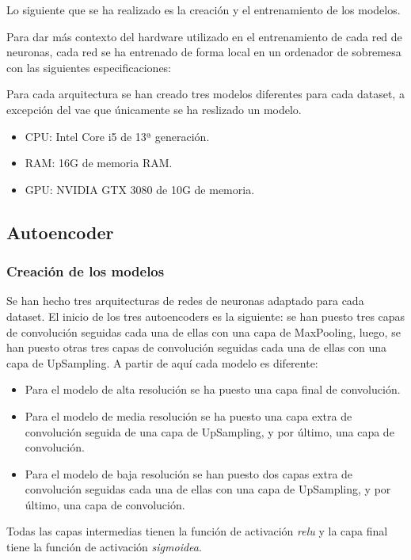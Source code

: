 Lo siguiente que se ha realizado es la creación y el entrenamiento de los modelos. 

Para dar más contexto del hardware utilizado en el entrenamiento de cada red de neuronas, cada red se ha entrenado de forma local en un ordenador de sobremesa con las siguientes especificaciones:

Para cada arquitectura se han creado tres modelos diferentes para cada dataset, a excepción del \gls{vae} que únicamente se ha reslizado un modelo.

\begin{itemize}
	\item CPU: Intel Core i5 de 13ª generación.
	\item RAM: 16G de memoria RAM.
	\item GPU: NVIDIA GTX 3080 de 10G de memoria.
\end{itemize}

\subsection{Autoencoder}

\subsubsection{Creación de los modelos}

\quad Se han hecho tres arquitecturas de redes de neuronas adaptado para cada dataset. El inicio de los tres autoencoders es la siguiente: se han puesto tres capas de convolución seguidas cada una de ellas con una capa de MaxPooling, luego, se han puesto otras tres capas de convolución seguidas cada una de ellas con una capa de UpSampling. A partir de aquí cada modelo es diferente:

\begin{itemize}
	\item Para el modelo de alta resolución se ha puesto una capa final de convolución.
	\item Para el modelo de media resolución se ha puesto una capa extra de convolución seguida de una capa de UpSampling, y por último, una capa de convolución.
	\item Para el modelo de baja resolución se han puesto dos capas extra de convolución seguidas cada una de ellas con una capa de UpSampling, y por último, una capa de convolución.
\end{itemize}

Todas las capas intermedias tienen la función de activación \textit{relu} y la capa final tiene la función de activación \textit{sigmoidea}.


